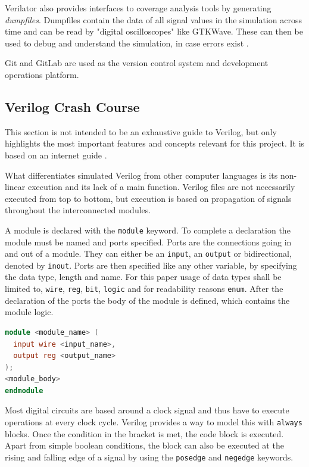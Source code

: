 Verilator also provides interfaces to coverage analysis tools by generating \textit{dumpfiles}. Dumpfiles contain the data of all signal values in the simulation across time and can be read by "digital oscilloscopes" like GTKWave. These can then be used to debug and understand the simulation, in case errors exist \cite{verilatoroverview}.

Git and GitLab are used as the version control system and development operations platform.

\subsection{Verilog Crash Course}
This section is not intended to be an exhaustive guide to Verilog, but only highlights the most important features and concepts relevant for this project. It is based on an internet guide \cite{verilogcourse}.

What differentiates simulated Verilog from other computer languages is its non-linear execution and its lack of a main function. Verilog files are not necessarily executed from top to bottom, but execution is based on propagation of signals throughout the interconnected modules. 

A module is declared with the \texttt{module} keyword. To complete a declaration the module must be named and ports specified. Ports are the connections going in and out of a module. They can either be an \texttt{input}, an \texttt{output} or bidirectional, denoted by \texttt{inout}. Ports are then specified like any other variable, by specifying the data type, length and name. For this paper usage of data types shall be limited to, \texttt{wire}, \texttt{reg}, \texttt{bit}, \texttt{logic} and for readability reasons \texttt{enum}. After the declaration of the ports the body of the module is defined, which contains the module logic.
\pagebreak
\begin{lstlisting}[language=Verilog, caption=Module definition]
module <module_name> (
  input wire <input_name>,
  output reg <output_name>
);
<module_body>
endmodule
\end{lstlisting}


Most digital circuits are based around a clock signal and thus have to execute operations at every clock cycle. Verilog provides a way to model this with \texttt{always} blocks. Once the condition in the bracket is met, the code block is executed. Apart from simple boolean conditions, the block can also be executed at the rising and falling edge of a signal by using the \texttt{posedge} and \texttt{negedge} keywords.

